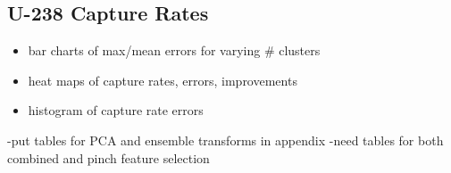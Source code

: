 \subsection{U-238 Capture Rates}
\label{subsec:chap11-capture-rates}

\begin{itemize}[noitemsep]
  \item bar charts of max/mean errors for varying \# clusters
  \item heat maps of capture rates, errors, improvements
  \item histogram of capture rate errors
\end{itemize}

-put tables for PCA and ensemble transforms in appendix
-need tables for both combined and pinch feature selection

